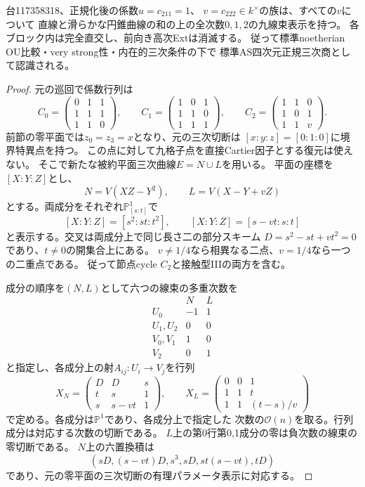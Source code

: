 \begin{theorem}[117358318の残余一係数族の曲線表示]
\label{thm:ou-six-zero-expanded-curve}
台117358318、正規化後の係数$u=c_{211}=1$、
$v=c_{222}\in k^\times$の族は、すべての$v$について
直線と滑らかな円錐曲線の和の上の全次数$0,1,2$の九線束表示を持つ。
各ブロック内は完全直交し、前向き高次Extは消滅する。
従って標準noetherian OU比較・very strong性・内在的三次条件の下で
標準AS四次元正規三次商として認識される。
\end{theorem}
\begin{proof}
元の巡回で係数行列は
\[
 C_0=\begin{pmatrix}0&1&1\\1&1&1\\1&1&0\end{pmatrix},\qquad
 C_1=\begin{pmatrix}1&0&1\\1&1&0\\1&1&1\end{pmatrix},\qquad
 C_2=\begin{pmatrix}1&1&0\\1&0&1\\1&1&v\end{pmatrix}.
\]
前節の零平面では$z_0=z_3=x$となり、元の三次切断は
$[x:y:z]=[0:1:0]$に境界特異点を持つ。
この点に対して九格子点を直接Cartier因子とする復元は使えない。
そこで新たな被約平面三次曲線$E=N\cup L$を用いる。
平面の座標を$[X:Y:Z]$とし、
\[
 N=V(XZ-Y^2),\qquad L=V(X-Y+vZ)
\]
とする。両成分をそれぞれ$\mathbb P^1_{[s:t]}$で
\[
 [X:Y:Z]=[s^2:st:t^2],\qquad
 [X:Y:Z]=[s-vt:s:t]
\]
と表示する。交叉は両成分上で同じ長さ二の部分スキーム
$D=s^2-st+vt^2=0$であり、$t\ne0$の開集合上にある。
$v\ne1/4$なら相異なる二点、$v=1/4$なら一つの二重点である。
従って節点cycle $C_2$と接触型IIIの両方を含む。

成分の順序を$(N,L)$として六つの線束の多重次数を
\[
 \begin{array}{c|rr}
 &N&L\\ \hline
 U_0&-1&1\\
 U_1,U_2&0&0\\
 V_0,V_1&1&0\\
 V_2&0&1
 \end{array}
\]
と指定し、各成分上の射$A_{ij}:U_i\to V_j$を行列
\[
 X_N=\begin{pmatrix}D&D&s\\t&s&1\\s&s-vt&1\end{pmatrix},\qquad
 X_L=\begin{pmatrix}0&0&1\\1&1&t\\1&1&(t-s)/v\end{pmatrix}
\]
で定める。各成分は$\mathbb P^1$であり、各成分上で指定した
次数の$\mathcal O(n)$を取る。行列成分は対応する次数の切断である。
$L$上の第0行第0,1成分の零は負次数の線束の零切断である。
$N$上の六置換積は
\[
 (sD,(s-vt)D,s^3,sD,st(s-vt),tD)
\]
であり、元の零平面の三次切断の有理パラメータ表示に対応する。


\end{proof}
